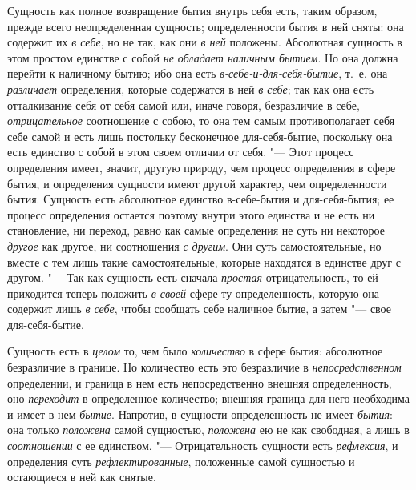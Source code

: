 Сущность как полное возвращение бытия внутрь себя есть, таким образом,
прежде всего неопределенная сущность; определенности бытия в ней сняты: она
содержит их {\em в себе}, но не так, как они
{\em в ней} положены. Абсолютная сущность в этом
простом единстве с собой {\em не обладает наличным
бытием}. Но она должна перейти к наличному бытию; ибо она есть
{\em в-себе-и-для-себя-бытие}, т.~е. она
{\em различает} определения, которые содержатся в ней
{\em в себе}; так как она есть отталкивание себя от
себя самой или, иначе говоря, безразличие в себе,
{\em отрицательное} соотношение с собою, то она тем
самым противополагает себя себе самой и есть лишь постольку бесконечное
для-себя-бытие, поскольку она есть единство с собой в этом своем отличии от
себя. "--- Этот процесс определения имеет, значит, другую природу, чем процесс
определения в сфере бытия, и определения сущности имеют другой характер,
чем определенности бытия. Сущность есть абсолютное единство в-себе-бытия и
для-себя-бытия; ее процесс определения остается поэтому внутри этого
единства и не есть ни становление, ни переход, равно как самые определения
не суть ни некоторое {\em другое} как другое, ни
соотношения {\em с другим}. Они суть самостоятельные,
но вместе с тем лишь такие самостоятельные, которые находятся в единстве
друг с другом. "--- Так как сущность есть сначала
{\em простая} отрицательность, то ей приходится теперь
положить {\em в своей} сфере ту определенность, которую
она содержит лишь {\em в себе}, чтобы сообщать себе
наличное бытие, а затем "--- свое для-себя-бытие.

Сущность есть в {\em целом} то, чем было
{\em количество} в сфере бытия: абсолютное безразличие
в границе. Но количество есть это безразличие в
{\em непосредственном} определении, и граница в нем
есть непосредственно внешняя определенность, оно
{\em переходит} в определенное количество; внешняя
граница для него необходима и имеет в нем {\em бытие}.
Напротив, в сущности определенность не имеет
{\em бытия}: она только
{\em положена} самой сущностью,
{\em положена} ею не как свободная, а лишь в
{\em соотношении} с ее единством. "--- Отрицательность
сущности есть {\em рефлексия}, и определения суть
{\em рефлектированные}, положенные самой сущностью и
остающиеся в ней как снятые.

